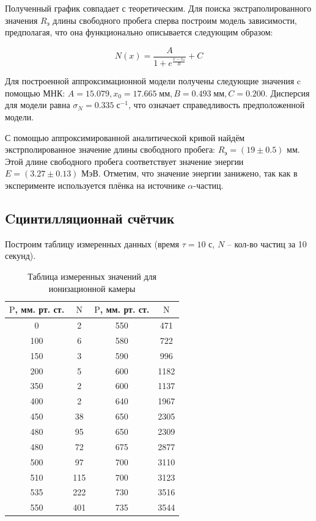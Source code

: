 \documentclass[a4paper, 12pt]{article}%
\begin{document}
    Полученный график совпадает с теоретическим. Для поиска экстраполированного значения $R_{\text{э}}$ длины свободного пробега сперва построим модель зависимости, предполагая, что она функционально описывается следующим образом:

    \begin{equation}
        N(x) = \frac{A}{1 + e^{\frac{x - x_0}{B}}} + C
    \end{equation}

    Для построенной аппроксимационной модели получены следующие значения c помощью МНК: $A = 15.079, x_0 = 17.665 \; \text{мм}, B = 0.493 \; \text{мм}, C = 0.200$. Дисперсия для модели равна $\sigma_N = 0.335 \; \text{с}^{-1}$, что означает справедливость предположенной модели.
    
    С помощью аппроксимированной аналитической кривой найдём экстрполированное значение длины свободного пробега: $R_{\text{э}} = (19 \pm 0.5)$ мм. Этой длине свободного пробега соответствует значение энергии $E = (3.27 \pm 0.13)$ МэВ. Отметим, что значение энергии занижено, так как в эксперименте используется плёнка на источнике $\alpha$-частиц.

\subsection{Cцинтилляционнай счётчик}

    Построим таблицу измеренных данных (время $\tau = 10$ с, $N$ -- кол-во частиц за 10 секунд).

    \begin{table}[!h]
        \centering
        \begin{tabular}{|c|c|c|c|}
\hline $\mathrm{P}$, мм. рт. ст.  & $\mathrm{N}$ & $\mathrm{P}$, мм. рт. ст.& $\mathrm{N}$ \\
\hline 0 & 2 & 550 & 471 \\
\hline 100 & 6 & 580 & 722 \\
\hline 150 & 3 & 590 & 996 \\
\hline 200 & 5 & 600 & 1182 \\
\hline 350 & 2 & 600 & 1137 \\
\hline 400 & 2 & 640 & 1967 \\
\hline 450 & 38 & 650 & 2305 \\
\hline 480 & 95 & 650 & 2309 \\
\hline 480 & 72 & 675 & 2877 \\
\hline 500 & 97 & 700 & 3110 \\
\hline 510 & 115 & 700 & 3123 \\
\hline 535 & 222 & 730 & 3516 \\
\hline 550 & 401 & 735 & 3544 \\
\hline
\end{tabular}
        \caption{Таблица измеренных значений для ионизационной камеры}
    \end{table}
\end{document}
